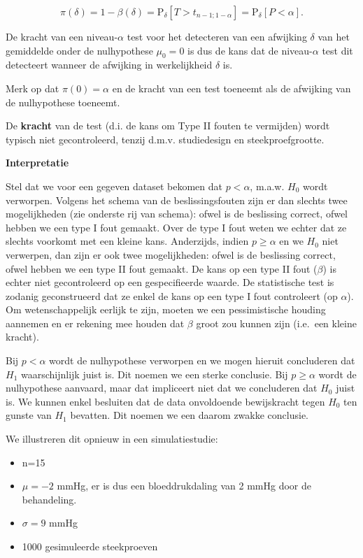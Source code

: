 \documentclass[
  12pt,dutch,coursenotes]{book}
\providecommand{\tightlist}{%
  \setlength{\itemsep}{0pt}\setlength{\parskip}{0pt}}
\begin{document}
\[\pi(\delta) = 1-\beta(\delta) = \text{P}_\delta\left[T>t_{n-1;1-\alpha}\right]=\text{P}_\delta\left[P<\alpha\right].\]

De kracht van een niveau-\(\alpha\) test voor het detecteren van een afwijking \(\delta\) van het gemiddelde onder de nulhypothese \(\mu_0=0\) is dus de kans dat de niveau-\(\alpha\) test dit detecteert wanneer de afwijking in werkelijkheid \(\delta\) is.

Merk op dat \(\pi(0)=\alpha\) en de kracht van een test toeneemt als de afwijking van de nulhypothese toeneemt.

De \textbf{kracht} van de test (d.i. de kans om Type II fouten te vermijden) wordt typisch niet gecontroleerd, tenzij d.m.v. studiedesign en steekproefgrootte.

\textbf{Interpretatie}

Stel dat we voor een gegeven dataset bekomen dat \(p<\alpha\), m.a.w. \(H_0\) wordt verworpen. Volgens het schema van de beslissingsfouten zijn er dan slechts twee mogelijkheden (zie onderste rij van schema): ofwel is de beslissing correct, ofwel hebben we een type I fout gemaakt. Over de type I fout weten we echter dat ze slechts voorkomt met een kleine kans.
Anderzijds, indien \(p\geq \alpha\) en we \(H_0\) niet verwerpen, dan zijn er ook twee mogelijkheden: ofwel is de beslissing correct, ofwel hebben we een type II fout gemaakt. De kans op een type II fout (\(\beta\)) is echter niet gecontroleerd op een gespecifieerde waarde. De statistische test is zodanig geconstrueerd dat ze enkel de kans op een type I fout controleert (op \(\alpha\)). Om wetenschappelijk eerlijk te zijn, moeten we een pessimistische houding aannemen en er rekening mee houden dat \(\beta\) groot zou kunnen zijn (i.e.~een kleine kracht).

Bij \(p < \alpha\) wordt de nulhypothese verworpen en we mogen hieruit concluderen dat \(H_1\) waarschijnlijk juist is. Dit noemen we een sterke conclusie.
Bij \(p\geq \alpha\) wordt de nulhypothese aanvaard, maar dat impliceert niet dat we concluderen dat \(H_0\) juist is. We kunnen enkel besluiten dat de data onvoldoende bewijskracht tegen \(H_0\) ten gunste van \(H_1\) bevatten. Dit noemen we een daarom zwakke conclusie.

We illustreren dit opnieuw in een simulatiestudie:

\begin{itemize}
\tightlist
\item
  n=15
\item
  \(\mu=-2\) mmHg, er is dus een bloeddrukdaling van 2 mmHg door de behandeling.
\item
  \(\sigma =9\) mmHg
\item
  1000 gesimuleerde steekproeven
\end{itemize}
\end{document}
